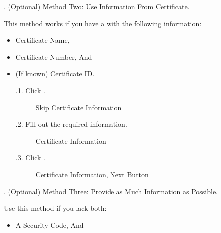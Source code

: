 \documentclass[letterpaper,10pt,english]{sphinxmanual}
\begin{document}
\begin{enumerate}
\begin{itemize}
\clearpage

\end{itemize}

. (Optional) Method Two: Use Information From Certificate.

\sphinxAtStartPar
This method works if you have a  with the following information:
\begin{itemize}
\item {} 
\sphinxAtStartPar
Certificate Name,

\item {} 
\sphinxAtStartPar
Certificate Number, And

\item {} 
\sphinxAtStartPar
(If known) Certificate ID.

.1.    Click .

\begin{figure}[htbp]
\centering
\capstart

\noindent{}
\caption{Skip Certificate Information}\label{\detokenize{index:id14}}\end{figure}

.2.   Fill out the required information.

\begin{figure}[htbp]
\centering
\capstart

\noindent{}
\caption{Certificate Information}\label{\detokenize{index:id16}}\end{figure}

.3.   Click .

\begin{figure}[htbp]
\centering
\capstart

\noindent{}
\caption{Certificate Information, Next Button}\label{\detokenize{index:id18}}\end{figure}

\clearpage

\end{itemize}

. (Optional) Method Three: Provide as Much Information as Possible.

\sphinxAtStartPar
Use this method if you lack both:
\begin{itemize}
\item {} 
\sphinxAtStartPar
A Security Code, And


\end{itemize}
\end{enumerate}
\end{document}
